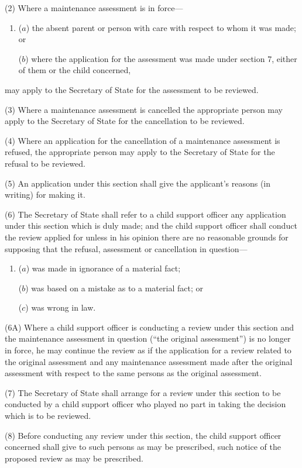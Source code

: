 \documentclass[12pt,a4paper]{article}
\begin{document}
(2) Where a maintenance assessment is in force—
\begin{enumerate}\item[]
($a$) the absent parent or person with care with respect to whom it was made; or

($b$) where the application for the assessment was made under section 7, either of them or the child concerned,
\end{enumerate}
may apply to the Secretary of State for the assessment to be reviewed.

(3) Where a maintenance assessment is cancelled the appropriate person may apply to the Secretary of State for the cancellation to be reviewed.

(4) Where an application for the cancellation of a maintenance assessment is refused, the appropriate person may apply to the Secretary of State for the refusal to be reviewed.

(5) An application under this section shall give the applicant’s reasons (in writing) for making it.

(6) The Secretary of State shall refer to a child support officer any application under this section which is duly made; and the child support officer shall conduct the review applied for unless in his opinion there are no reasonable grounds for supposing that the refusal, assessment or cancellation in question—
\begin{enumerate}\item[]
($a$) was made in ignorance of a material fact;

($b$) was based on a mistake as to a material fact;
or  %

($c$) was wrong in law.
\end{enumerate}

(6A) Where a child support officer is conducting a review under this section and the maintenance assessment in question (“the original assessment”) is no longer in force, he may continue the review as if the application for a review related to the original assessment and any maintenance assessment made after the original assessment with respect to the same persons as the original assessment.

(7) The Secretary of State shall arrange for a review under this section to be conducted by a child support officer who played no part in taking the decision which is to be reviewed.

(8) Before conducting any review under this section, the child support officer concerned shall give to such persons as may be prescribed, such notice of the proposed review as may be prescribed.
\end{document}
